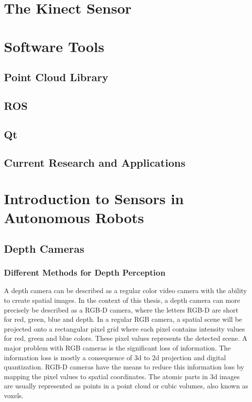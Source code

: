\section{The Kinect Sensor}

\section{Software Tools}

\subsection{Point Cloud Library}

\subsection{ROS}

\subsection{Qt}


\subsection{Current Research and Applications}

\section{Introduction to Sensors in Autonomous Robots}

\subsection{Depth Cameras}

\subsubsection{Different Methods for Depth Perception}

A depth camera can be described as a regular color video camera with the ability to create spatial images. In the context of this thesis, a depth camera can  more precisely be described as a RGB-D camera, where the letters RGB-D are short for red, green, blue and depth. In a regular RGB camera, a spatial scene will be projected onto a rectangular pixel grid where each pixel contains intensity values for red, green and blue colors. These pixel values represents the detected scene. A major problem with RGB cameras is the significant loss of information. The information loss is mostly a consequence of 3d to 2d projection and digital quantization. RGB-D cameras have the means to reduce this information loss by mapping the pixel values to spatial coordinates. The atomic parts in 3d images are usually represented as points in a point cloud or cubic volumes, also known as voxels.

